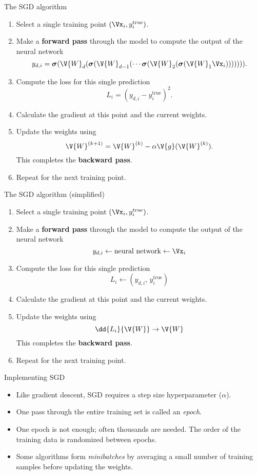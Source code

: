 \documentclass[9pt]{beamer}
\newcommand\VW{\V{W}}
\newcommand\bsigma{\boldsymbol{\sigma}}
\newcommand\ytrue{y^\mathrm{true}}
\begin{document}
\begin{frame}{The SGD algorithm}

\begin{enumerate}
	\item Select a single training point $(\Vx_i,\ytrue_i)$.
	\item Make a \textbf{forward pass} through the model to compute the output of the neural network
		\[ y_{d,i} = \bsigma(\V{W}_d(\bsigma(\V{W}_{d-1}(\cdots\bsigma(\V{W}_2(\bsigma(\V{W}_1\Vx_i))))))). \]
	\item Compute the loss for this single prediction
		\[ L_i = (y_{d,i} - \ytrue_i)^2. \]
	\item Calculate the gradient at this point and the current weights.
	\item Update the weights using
		\[ \VW^{(k+1)} = \VW^{(k)} - \alpha \V{g}(\VW^{(k)}). \]
		This completes the \textbf{backward pass}.
	\item Repeat for the next training point.
\end{enumerate}
	
\end{frame}

\begin{frame}{The SGD algorithm (simplified)}

\begin{enumerate}
	\item Select a single training point $(\Vx_i,\ytrue_i)$.
	\item Make a \textbf{forward pass} through the model to compute the output of the neural network
		\[ y_{d,i} \leftarrow \text{neural network} \leftarrow \Vx_i \]
	\item Compute the loss for this single prediction
		\[ L_i \leftarrow (y_{d,i},\, \ytrue_i) \]
	\item Calculate the gradient at this point and the current weights.
	\item Update the weights using
		\[ \dd{L_i}{\VW} \rightarrow \VW \]
		This completes the \textbf{backward pass}.
	\item Repeat for the next training point.
\end{enumerate}
	
\end{frame}

\begin{frame}{Implementing SGD}

\addtolength{\itemsep}{0.5\baselineskip}
\begin{itemize}
	\item Like gradient descent, SGD requires a step size hyperparameter ($\alpha$).
	\item One pass through the entire training set is called an \emph{epoch}.
	\item One epoch is not enough; often thousands are needed. The order of the training data is randomized between epochs.
	\item Some algorithms form \emph{minibatches} by averaging a small number of training samples before updating the weights.
\end{itemize}
	
\end{frame}
\end{document}
